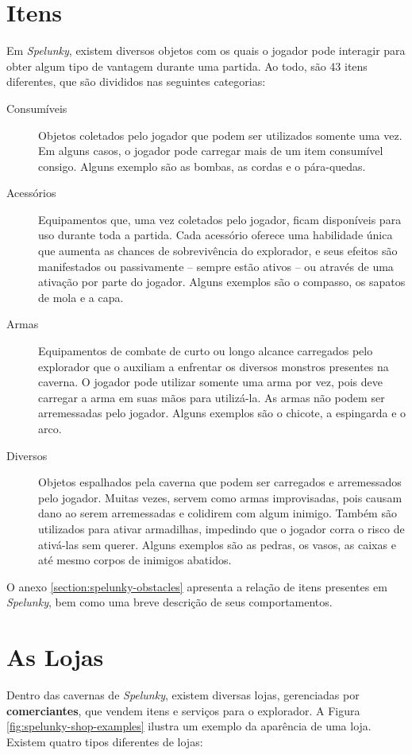 \section{\label{section:spelunky-items}Itens}
Em \textit{Spelunky}, existem diversos objetos com os quais o jogador pode
interagir para obter algum tipo de vantagem durante uma partida. Ao todo, são 43
itens diferentes, que são divididos nas seguintes categorias:

\begin{description}
	\item[Consumíveis]
	Objetos coletados pelo jogador que podem ser utilizados somente uma vez. Em
	alguns casos, o jogador pode carregar mais de um item consumível consigo.
	Alguns exemplo são as bombas, as cordas e o pára-quedas.

	\item[Acessórios]
	Equipamentos que, uma vez coletados pelo jogador, ficam disponíveis para uso
	durante toda a partida. Cada acessório oferece uma habilidade única que
	aumenta as chances de sobrevivência do explorador, e seus efeitos são
	manifestados ou passivamente -- sempre estão ativos -- ou através de uma
	ativação por parte do jogador. Alguns exemplos são o compasso, os sapatos de
	mola e a capa.

	\item[Armas]
	Equipamentos de combate de curto ou longo alcance carregados pelo explorador
	que o auxiliam a enfrentar os diversos monstros presentes na caverna. O
	jogador pode utilizar somente uma arma por vez, pois deve carregar a arma em
	suas mãos para utilizá-la. As armas não podem ser arremessadas pelo jogador.
	Alguns exemplos são o chicote, a espingarda e o arco.

	\item[Diversos]
	Objetos espalhados pela caverna que podem ser carregados e arremessados pelo
	jogador. Muitas vezes, servem como armas improvisadas, pois causam dano ao
	serem arremessadas e colidirem com algum inimigo. Também são utilizados para
	ativar armadilhas, impedindo que o jogador corra o risco de ativá-las sem
	querer. Alguns exemplos são as pedras, os vasos, as caixas e até mesmo
	corpos de inimigos abatidos. 
\end{description}

O anexo \ref{section:spelunky-obstacles} apresenta a relação de itens presentes
em \textit{Spelunky}, bem como uma breve descrição de seus comportamentos.


\section{\label{section:spelunky-shops}As Lojas}
Dentro das cavernas de \textit{Spelunky}, existem diversas lojas, gerenciadas
por \textbf{comerciantes}, que vendem itens e serviços para o explorador. A
Figura \ref{fig:spelunky-shop-examples} ilustra um exemplo da aparência de uma
loja. Existem quatro tipos diferentes de lojas:

